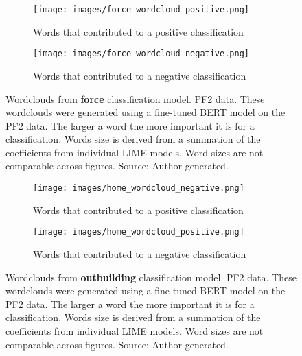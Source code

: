 \begin{figure}
     \centering
     \begin{subfigure}[b]{0.9\textwidth}
         \centering
         \texttt{[image: images/force\_wordcloud\_positive.png]}
         \caption{Words that contributed to a positive classification}
         \label{fig: wordcloud_force_lancs}
     \end{subfigure}
     \vfill
     \begin{subfigure}[b]{0.9\textwidth}
         \centering
         \texttt{[image: images/force\_wordcloud\_negative.png]}
         \caption{Words that contributed to a negative classification}
         \label{fig: wordcloud_force_rev_lancs}
     \end{subfigure}
        \caption[Wordclouds from  \textbf{force} classification model. PF2 data.]{{Wordclouds from  \textbf{force} classification model. PF2 data.} These wordclouds were generated using a fine-tuned BERT model on the PF2 data. The larger a word the more important it is for a classification. Words size is derived from a summation of the coefficients from individual LIME models. Word sizes are not comparable across figures. Source: Author generated.}
        \label{fig:wordcloud_force_both_lancs}
        
\end{figure}




\begin{figure}
     \centering
     \begin{subfigure}[b]{0.9\textwidth}
         \centering
         \texttt{[image: images/home\_wordcloud\_negative.png]}
         \caption{Words that contributed to a positive classification}
         \label{fig: wordcloud_home_lancs}
     \end{subfigure}
     \vfill
     \begin{subfigure}[b]{0.9\textwidth}
         \centering
         \texttt{[image: images/home\_wordcloud\_positive.png]}
         \caption{Words that contributed to a negative classification}
         \label{fig: wordcloud_home_rev_lancs}
     \end{subfigure}
        \caption[Wordclouds from  \textbf{outbuilding} classification model. PF2 data.]{{Wordclouds from  \textbf{outbuilding} classification model. PF2 data.} These wordclouds were generated using a fine-tuned BERT model on the PF2 data. The larger a word the more important it is for a classification. Words size is derived from a summation of the coefficients from individual LIME models. Word sizes are not comparable across figures. Source: Author generated.}
        \label{fig:wordcloud_home_both_lancs}
        
\end{figure}




